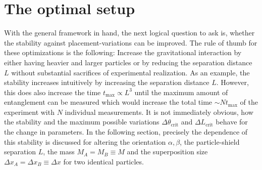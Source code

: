\newpage
\section{The optimal setup}\label{sec:4:optimal-setup}
With the general framework in hand, the next logical question to ask is, whether the stability against placement-variations can be improved.
The rule of thumb for these optimizations is the following:
Increase the gravitational interaction by either having heavier and larger particles or by reducing the separation distance $L$ without substantial sacrifices of experimental realization.
As an example, the stability increases intuitively by increasing the separation distance $L$. However, this does also increase the time $t_\mathrm{max} \propto L^3$ until the maximum amount of entanglement can be measured which would increase the total time $\sim N t_\mathrm{max}$ of the experiment with $N$ individual measurements.
It is not immediately obvious, how the stability and the maximum possible variations $\Delta \theta_\mathrm{crit}$ and $\Delta L_\mathrm{crit}$ behave for the change in parameters.
In the following section, precisely the dependence of this stability is discussed for altering the orientation $\alpha, \beta$, the particle-shield separation $L$, the mass $M_A = M_B \equiv M$ and the superposition size $\Delta x_A = \Delta x_B \equiv \Delta x$ for two identical particles.


